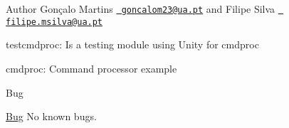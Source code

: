 \begin{DoxyAuthor}{Author}
Gonçalo Martins \href{mailto:goncalom23@ua.pt}{\texttt{ goncalom23@ua.\+pt}} and Filipe Silva \href{mailto:filipe.msilva@ua.pt}{\texttt{ filipe.\+msilva@ua.\+pt}}
\end{DoxyAuthor}
testcmdproc\+: Is a testing module using Unity for cmdproc

cmdproc\+: Command processor example

\begin{DoxyRefDesc}{Bug}
\item[\mbox{\hyperlink{bug__bug000001}{Bug}}]No known bugs.\end{DoxyRefDesc}
